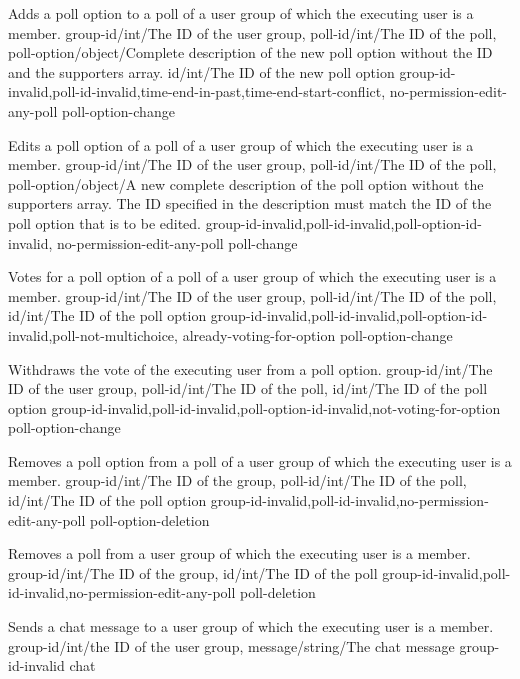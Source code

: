 \documentclass[parskip=full,11pt]{scrartcl}
\begin{document}
{Adds a poll option to a poll of a user group of which the executing user is a
member.}
{group-id/int/The ID of the user group,
poll-id/int/The ID of the poll,
poll-option/object/Complete description of the new poll option without the ID and the
supporters array.}
{id/int/The ID of the new poll option}
{group-id-invalid,poll-id-invalid,time-end-in-past,time-end-start-conflict,
no-permission-edit-any-poll}
{poll-option-change}

{Edits a poll option of a poll of a user group of which the executing user is
a member.}
{group-id/int/The ID of the user group,
poll-id/int/The ID of the poll,
poll-option/object/A new complete description of the poll option without the
supporters array.
The ID specified in the description must match the ID of the poll option that
is to be edited.}
{}
{group-id-invalid,poll-id-invalid,poll-option-id-invalid,%
no-permission-edit-any-poll}
{poll-change}

{Votes for a poll option of a poll of a user group of which the executing user
is a member.}
{group-id/int/The ID of the user group,
poll-id/int/The ID of the poll,
id/int/The ID of the poll option}
{}
{group-id-invalid,poll-id-invalid,poll-option-id-invalid,poll-not-multichoice,
already-voting-for-option}
{poll-option-change}

{Withdraws the vote of the executing user from a poll option.}
{group-id/int/The ID of the user group,
poll-id/int/The ID of the poll,
id/int/The ID of the poll option}
{}
{group-id-invalid,poll-id-invalid,poll-option-id-invalid,not-voting-for-option}
{poll-option-change}

{Removes a poll option from a poll of a user group of which the executing user
is a member.}
{group-id/int/The ID of the group,
poll-id/int/The ID of the poll,
id/int/The ID of the poll option}
{}
{group-id-invalid,poll-id-invalid,no-permission-edit-any-poll}
{poll-option-deletion}

{Removes a poll from a user group of which the executing user is a member.}
{group-id/int/The ID of the group,
id/int/The ID of the poll}
{}
{group-id-invalid,poll-id-invalid,no-permission-edit-any-poll}
{poll-deletion}

{Sends a chat message to a user group of which the executing user is a member.}
{group-id/int/the ID of the user group,
message/string/The chat message}
{}
{group-id-invalid}
{chat}
\end{document}
